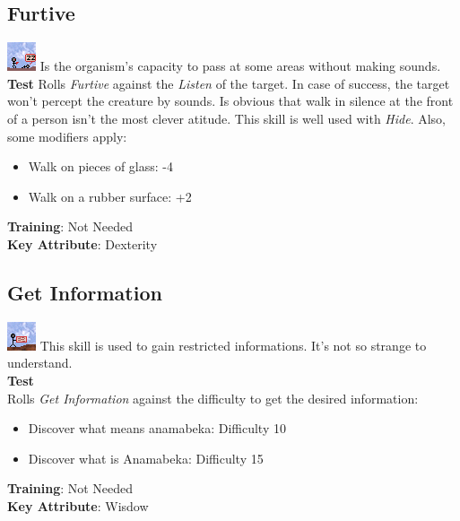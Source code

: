 \documentclass[ letterpaper,12pt]{article}
\begin{document}
\subsection{Furtive}
\includegraphics{../data/skills/Img/furtividade.png}
Is the organism's capacity to pass at some areas without making sounds.\\
{\bf Test}
Rolls {\it Furtive} against the {\it Listen} of the target. In case of success, the target won't percept the creature by sounds. Is obvious that walk in silence at the front of a person isn't the most clever atitude. This skill is well used with {\it Hide}. Also, some modifiers apply:
\begin{itemize}
\item{Walk on pieces of glass: -4}
\item{Walk on a rubber surface: +2}
\end{itemize}
{\bf Training}: Not Needed\\
{\bf Key Attribute}: Dexterity

\subsection{Get Information}
\includegraphics{../data/skills/Img/obterinf.png}
This skill is used to gain restricted informations. It's not so strange to understand.\\
{\bf Test}\\
Rolls {\it Get Information} against the difficulty to get the desired information:\\
\begin{itemize}
\item{Discover what means anamabeka: Difficulty 10}
\item{Discover what is Anamabeka: Difficulty 15}
\end{itemize}
{\bf Training}: Not Needed\\
{\bf Key Attribute}: Wisdow\\
\end{document}
